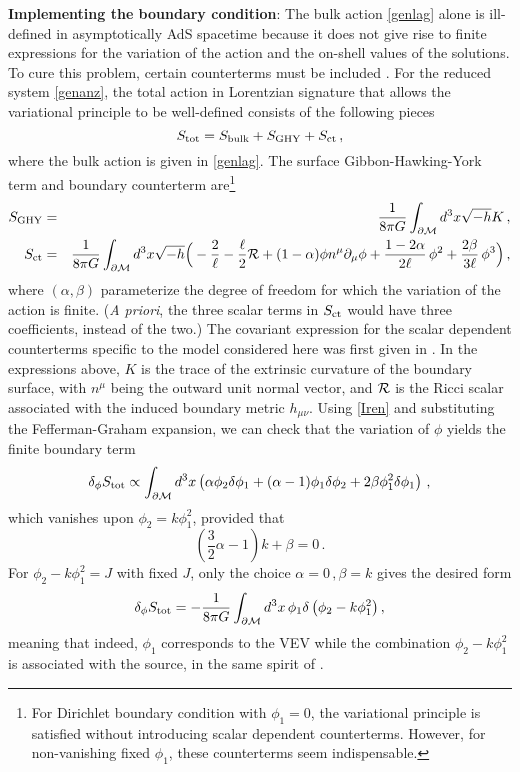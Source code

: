 \documentclass[11pt]{article}
\newcommand{\be}{\begin{equation}}
\newcommand{\ee}{\end{equation}}
\newcommand{\bea}{\setlength\arraycolsep{2pt} \begin{eqnarray}}
\newcommand{\eea}{\end{eqnarray}}
\newcommand{\nn}{\nonumber}
\def\ft#1#2{{\textstyle{\frac{\scriptstyle #1}{\scriptstyle #2} } }}
\def\fft#1#2{{\frac{#1}{#2}}}
\def\del{{\partial}}
\begin{document}
{\bf Implementing the boundary condition}: The bulk action \eqref{genlag} alone is ill-defined in asymptotically AdS spacetime because it does not give rise to finite expressions for the variation of the action and
the on-shell values of the solutions. To cure this problem, certain counterterms must be included \cite{Balasubramanian:1999re,Bianchi:2001kw}. For the reduced system \eqref{genanz}, the total action in Lorentzian signature that allows the variational principle to be well-defined consists of the following pieces
\be
S_{\rm tot}=S_{\rm bulk}+S_{\rm GHY}+S_{\rm ct}\,,\label{Iren}
\ee
where the bulk action is given in \eqref{genlag}. The surface Gibbon-Hawking-York \cite{York:1972sj,Gibbons:1976ue} term and boundary counterterm are\footnote{For Dirichlet boundary condition with $\phi_1=0$, the variational principle is satisfied without introducing scalar dependent counterterms. However, for non-vanishing fixed $\phi_1$, these counterterms seem indispensable.}
\bea
S_{\rm GHY} &=&
 \frac{1}{8\pi G}\int_{\partial {\cal M}}d^3x \sqrt{-h}K\,,\nn\\
S_{\rm ct}&=&\frac{1}{8\pi G }\int_{\partial {\cal M}} d^3x
\sqrt{-h}\Big(-\frac2{\ell}-\frac{\ell}2{\cal R}
+(1-\alpha) \phi n^\mu\del_\mu\phi +
\fft{1-2\alpha}{2\ell}\, \phi^2 +
\fft{2\beta}{3\ell}\, \phi^3 \Big)\,,
\eea
where $(\alpha,\beta)$ parameterize the degree of freedom for which the variation of the action is finite. ({\it A priori}, the three scalar terms in $S_{\rm ct}$ would have three coefficients, instead of the two.)  The covariant expression for the scalar dependent counterterms specific to the model considered here was first given in \cite{Cremonini:2014gia}. In the expressions above, $K$ is the trace of the extrinsic curvature of the boundary surface, with $n^{\mu}$ being the outward unit normal vector, and ${\cal R}$ is the Ricci scalar associated with the induced boundary metric $h_{\mu\nu}$. Using \eqref{Iren} and substituting the Fefferman-Graham expansion, we can check that the variation of $\phi$ yields the finite boundary term
\be
\delta_{\phi}S_{\rm tot}\propto \int_{\partial {\cal M}} d^3x \left({\alpha}\phi_2\delta\phi_1
+(\alpha-1)\phi_1\delta\phi_2+2\beta\phi_1^2\delta\phi_1\right)\,,
\ee
which vanishes upon $\phi_2=k\phi_1^2$, provided that
\be
(\ft{3}2 \alpha-1)k+\beta=0\,.
\ee
For $\phi_2-k\phi_1^2=J$ with fixed $J$, only the choice $\alpha=0\,,\beta=k$ gives the desired form
\be
\delta_{\phi}S_{\rm tot}=-\frac1{8\pi G} \int_{\partial {\cal M}} d^3x\, \phi_1\delta\left(\phi_2-k\phi_1^2\right),
\ee
meaning that indeed, $\phi_1$ corresponds to the VEV while the combination $\phi_2-k\phi_1^2$ is associated with the source, in the same spirit of \cite{Witten:2001ua}.
\end{document}
